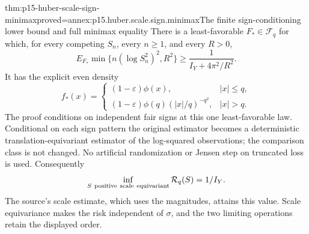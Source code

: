 \begin{hbtheorem}{thm:p15-huber-scale-sign-minimax}{proved=annex:p15.huber.scale.sign.minimax}{The finite sign-conditioning lower bound and full minimax equality}
There is a least-favorable \(F_*\in\mathcal F_q\) for which,
for every competing \(S_n\), every \(n\geq1\), and every \(R>0\),
\[
 E_{F_*}\min\{n(\log S_n^2)^2,R^2\}
                   \geq\frac1{I_Y+4\pi^2/R^2}.
\]
It has the explicit even density
\[
 f_*(x)=
 \begin{cases}
 (1-\varepsilon)\phi(x),&|x|\leq q,\\
 (1-\varepsilon)\phi(q)(|x|/q)^{-q^2},&|x|>q.
 \end{cases}
\]
The proof conditions on independent fair signs at this one
least-favorable law. Conditional on each sign pattern the original
estimator becomes a deterministic translation-equivariant estimator
of the log-squared observations; the comparison class is not changed.
No artificial randomization or Jensen step on truncated loss is used.
Consequently
\[
          \inf_{S\ {\rm positive\ scale\ equivariant}}\mathcal R_q(S)
                       =1/I_Y .
\]
The source's scale estimate, which uses the magnitudes, attains
this value. Scale equivariance makes the risk independent of
\(\sigma\), and the two limiting operations retain the displayed
order.
\end{hbtheorem}

